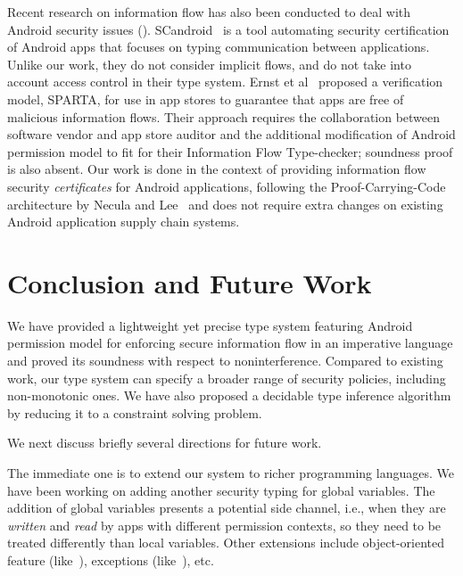 {{{Recent research on information flow has also been conducted to deal
with Android security issues
(\cite{Ernst:2014,Chin:2011wa,Nadkarni:2016tf,Lortz:2014ku,Gunadi:2015,Chaudhuri:2009ii,Fuchs2010}).
SCandroid~\cite{Chaudhuri:2009ii,Fuchs2010} is a tool automating
security certification of Android apps that focuses on typing
communication between applications. Unlike our work, they do not
consider implicit flows, and do not take into account access control
in their type system. Ernst et al~\cite{Ernst:2014} proposed a
verification model, SPARTA, for use in app stores to guarantee that
apps are free of malicious information flows. Their approach requires
the collaboration between software vendor and app store auditor and
the additional modification of Android permission model to fit for
their Information Flow Type-checker;
soundness proof is also absent. Our work is done in the context of
providing information flow security \emph{certificates} for Android
applications, following the Proof-Carrying-Code  architecture by
Necula and Lee~\cite{necula:pcc:1996} and does not require extra
changes on existing Android application supply chain systems.


 \section{Conclusion and Future Work}\label{sec:conclusion}

We have provided a lightweight yet precise type system featuring Android permission model for enforcing secure information flow in an
imperative language and proved its soundness with respect to noninterference.
Compared to existing work, our type system can specify a broader range of security policies, including non-monotonic ones.
We have also proposed a decidable type inference algorithm by reducing it to a constraint solving problem.

We next discuss briefly several directions for future work.

The immediate one is to extend our system to richer programming languages. We have been working on adding another security typing for global variables. The addition of global variables presents a potential side channel, i.e., when they are \emph{written} and \emph{read} by apps with different permission contexts, so they need to be treated differently than local variables. Other extensions include object-oriented feature (like~\cite{Sun:SAS04}), exceptions (like~\cite{Barthe:2006jh}), etc.

}}}
